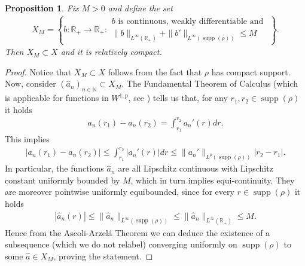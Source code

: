 \documentclass[A4paper,11pt]{article}
\newtheorem{proposition}[theorem]{Proposition}
\theoremstyle{definition}
\newcommand{\N}{\mathbb{N}}
\newcommand{\R}{\mathbb{R}}
\DeclareMathOperator{\supp}{supp}
\begin{document}
\begin{proposition}\label{XMdef}
Fix $M > 0$ and define the set
\begin{align*}
X_M = \left\{b:\R_+ \rightarrow \R_+ :
\begin{array}{cc}
b \text{ is continuous, weakly differentiable and }\\
 \|b\|_{L^{\infty}(\R_+)} + \|b'\|_{L^{\infty}(\supp(\rho))} \leq M
\end{array}
 \right\}.
\end{align*}
Then $X_M\subset X$ and it is relatively compact.
\end{proposition}
\begin{proof}
Notice that $X_M \subset X$ follows from the fact that $\rho$ has compact support. Now, consider $(\widehat a_n)_{n \in \N} \subset X_M$. The Fundamental Theorem of Calculus (which is applicable for functions in $W^{1,p}$, see \cite[Theorem 2.8]{AFP00}) tells us that, for any $r_1,r_2 \in\supp(\rho)$ it holds
	\begin{align*}
		a_n(r_1)-a_n(r_2)=\int_{r_1}^{r_2}a_n'(r)dr.
	\end{align*}
	This implies
	\begin{align*}
		\bigl|a_n(r_1)-a_n(r_2)\bigr|\leq\int_{r_1}^{r_2}|a_n'(r)|dr
			\leq \|a_n'\|_{L^p(\supp(\rho))}|r_2-r_1|.
	\end{align*}
	In particular, the functions $\widehat a_n$ are all Lipschitz continuous with Lipschitz constant uniformly bounded by
	$M$, which in turn implies equi-continuity. They are moreover pointwise uniformly equibounded, since for every $r \in \supp(\rho)$ it holds
	\begin{align*}
	|\widehat a_n(r)| \leq \|\widehat a_n\|_{L^{\infty}(\supp(\rho))} \leq \|\widehat a_n\|_{L^{\infty}(\R_+)} \leq M.
	\end{align*}
Hence from the Ascoli-Arzel\'a Theorem we can deduce the existence of a subsequence (which we do not relabel) converging uniformly on $\supp(\rho)$ to some $\widehat a \in X_M$, proving the statement.
\end{proof}
\end{document}
